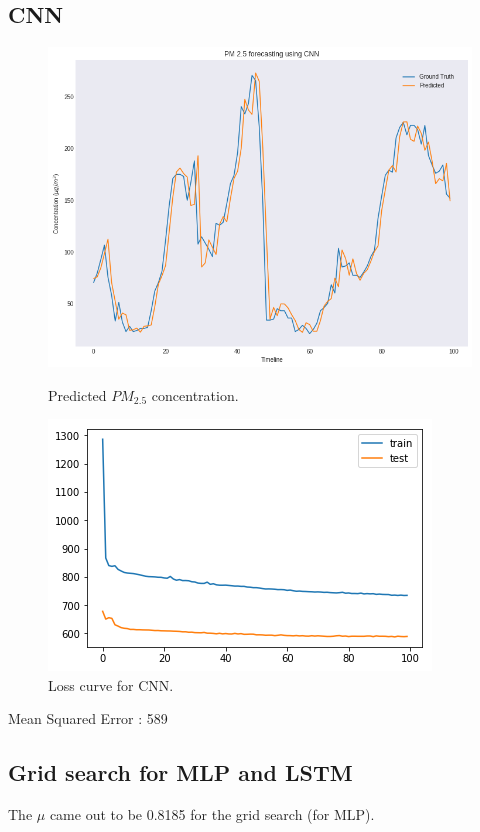 \documentclass{report}
\begin{document}
\subsection{CNN}
\begin{figure}[htbp]
	\centering
	\includegraphics[scale=0.5]{Images/cnn}
	\caption{Predicted $PM_{2.5}$ concentration.}
	\label{fig}

	\centering
	\includegraphics[scale=0.65]{Images/cnn_loss}
	\caption{Loss curve for CNN.}
	\label{fig}
\end{figure}
Mean Squared Error : 589	
\newpage
\subsection{Grid search for MLP and LSTM}
The $ \mu$ came out to be 0.8185 for the grid search (for MLP).

\end{document}
